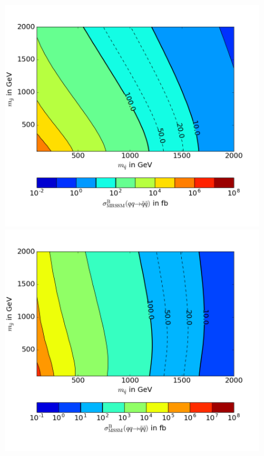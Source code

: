\begin{figure}[!htpb]
\begin{center}
\includegraphics[scale=.6]{figures/contour_MRSSM_squarks}
\includegraphics[scale=.6]{figures/contour_MSSM_squarks}
\caption{}
\end{center}
\end{figure}

